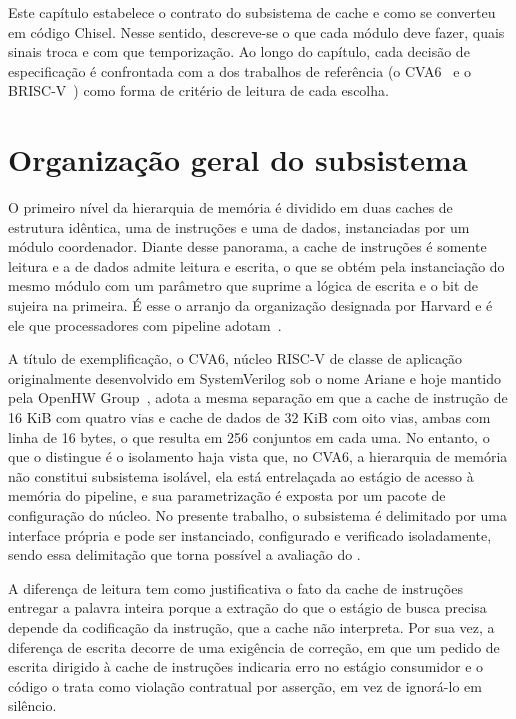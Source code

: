 Este capítulo estabelece o contrato do subsistema de cache e como se converteu em código Chisel. Nesse sentido, descreve-se o que cada módulo deve fazer, quais sinais troca e com que temporização. Ao longo do capítulo, cada decisão de especificação é confrontada com a dos trabalhos de referência (o CVA6~\cite{zaruba2019cost} e o BRISC-V~\cite{bandara2019briscv}) como forma de critério de leitura de cada escolha.

\section{Organização geral do subsistema}\label{sec:3.1}

O primeiro nível da hierarquia de memória é dividido em duas caches de estrutura idêntica, uma de instruções e uma de dados, instanciadas por um módulo coordenador. Diante desse panorama, a cache de instruções é somente leitura e a de dados admite leitura e escrita, o que se obtém pela instanciação do mesmo módulo com um parâmetro que suprime a lógica de escrita e o bit de sujeira na primeira. É esse o arranjo da organização designada por Harvard e é ele que processadores com pipeline adotam~\cite{patterson2020computer}.

A título de exemplificação, o CVA6, núcleo RISC-V de classe de aplicação originalmente desenvolvido em SystemVerilog sob o nome Ariane e hoje mantido pela OpenHW Group~\cite{zaruba2019cost}, adota a mesma separação em que a cache de instrução de 16 KiB com quatro vias e cache de dados de 32 KiB com oito vias, ambas com linha de 16 bytes, o que resulta em 256 conjuntos em cada uma. No entanto, o que o distingue é o isolamento haja vista que, no CVA6, a hierarquia de memória não constitui subsistema isolável, ela está entrelaçada ao estágio de acesso à memória do pipeline, e sua parametrização é exposta por um pacote de configuração do núcleo. No presente trabalho, o subsistema é delimitado por uma interface própria e pode ser instanciado, configurado e verificado isoladamente, sendo essa delimitação que torna possível a avaliação do .

A diferença de leitura tem como justificativa o fato da cache de instruções entregar a palavra inteira porque a extração do que o estágio de busca precisa depende da codificação da instrução, que a cache não interpreta. Por sua vez, a diferença de escrita decorre de uma exigência de correção, em que um pedido de escrita dirigido à cache de instruções indicaria erro no estágio consumidor e o código o trata como violação contratual por asserção, em vez de ignorá-lo em silêncio.


